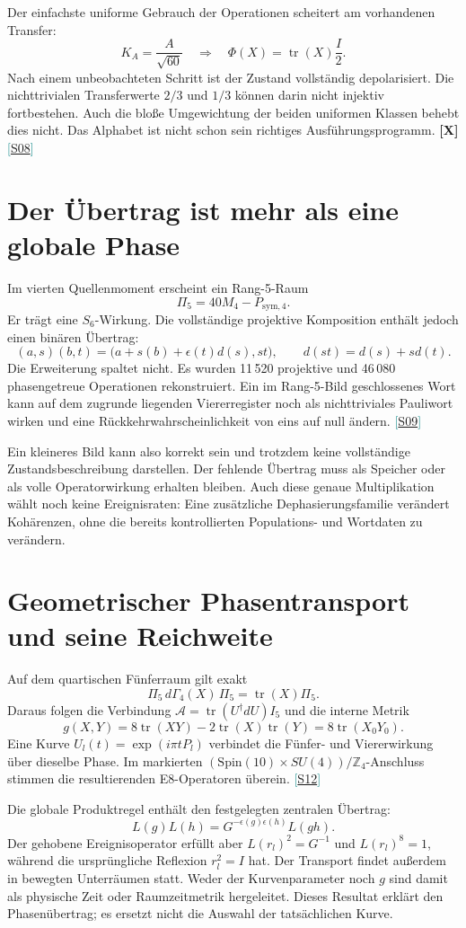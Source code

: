 \documentclass[11pt,a4paper,oneside,parskip=half,headings=normal,numbers=noenddot,bibliography=totoc]{scrreprt}
\newcommand{\Z}{\mathbb Z}
\newcommand{\tr}{\operatorname{tr}}
\newcommand{\src}[1]{\textcolor{teal}{\small[\hyperref[s:#1]{S#1}]}}
\newcommand{\st}[1]{\textsf{\textbf{[#1]}}}
\begin{document}
Der einfachste uniforme Gebrauch der Operationen scheitert am vorhandenen Transfer:
\[
 K_A=\frac A{\sqrt{60}}\quad\Longrightarrow\quad
 \Phi(X)=\tr(X)\frac I2.
\]
Nach einem unbeobachteten Schritt ist der Zustand vollständig depolarisiert. Die nichttrivialen Transferwerte $2/3$ und $1/3$ können darin nicht injektiv fortbestehen. Auch die bloße Umgewichtung der beiden uniformen Klassen behebt dies nicht. Das Alphabet ist nicht schon sein richtiges Ausführungsprogramm. \st{X} \src{08}

\section{Der Übertrag ist mehr als eine globale Phase}
Im vierten Quellenmoment erscheint ein Rang-5-Raum
\[
 \Pi_5=40M_4-P_{\mathrm{sym},4}.
\]
Er trägt eine $S_6$-Wirkung. Die vollständige projektive Komposition enthält jedoch einen binären Übertrag:
\[
 (a,s)(b,t)=\bigl(a+s(b)+\epsilon(t)d(s),st\bigr),
 \qquad d(st)=d(s)+sd(t).
\]
Die Erweiterung spaltet nicht. Es wurden 11\,520 projektive und 46\,080 phasengetreue Operationen rekonstruiert. Ein im Rang-5-Bild geschlossenes Wort kann auf dem zugrunde liegenden Viererregister noch als nichttriviales Pauliwort wirken und eine Rückkehrwahrscheinlichkeit von eins auf null ändern. \src{09}

Ein kleineres Bild kann also korrekt sein und trotzdem keine vollständige Zustandsbeschreibung darstellen. Der fehlende Übertrag muss als Speicher oder als volle Operatorwirkung erhalten bleiben. Auch diese genaue Multiplikation wählt noch keine Ereignisraten: Eine zusätzliche Dephasierungsfamilie verändert Kohärenzen, ohne die bereits kontrollierten Populations- und Wortdaten zu verändern.

\section{Geometrischer Phasentransport und seine Reichweite}
Auf dem quartischen Fünferraum gilt exakt
\[
 \Pi_5\,d\Gamma_4(X)\,\Pi_5=\tr(X)\Pi_5.
\]
Daraus folgen die Verbindung $\mathcal A=\tr(U^\dagger dU)I_5$ und die interne Metrik
\[
 g(X,Y)=8\tr(XY)-2\tr(X)\tr(Y)=8\tr(X_0Y_0).
\]
Eine Kurve $U_l(t)=\exp(i\pi tP_l)$ verbindet die Fünfer- und Viererwirkung über dieselbe Phase. Im markierten $(\mathrm{Spin}(10)\times SU(4))/\Z_4$-Anschluss stimmen die resultierenden E8-Operatoren überein. \src{12}

Die globale Produktregel enthält den festgelegten zentralen Übertrag:
\[
 L(g)L(h)=G^{-\epsilon(g)\epsilon(h)}L(gh).
\]
Der gehobene Ereignisoperator erfüllt aber $L(r_l)^2=G^{-1}$ und $L(r_l)^8=1$, während die ursprüngliche Reflexion $r_l^2=I$ hat. Der Transport findet außerdem in bewegten Unterräumen statt. Weder der Kurvenparameter noch $g$ sind damit als physische Zeit oder Raumzeitmetrik hergeleitet. Dieses Resultat erklärt den Phasenübertrag; es ersetzt nicht die Auswahl der tatsächlichen Kurve.
\end{document}
